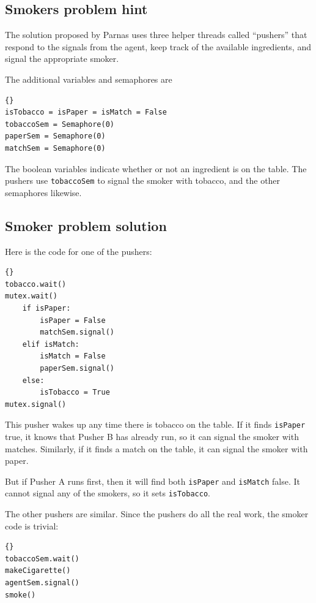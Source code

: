 \documentclass{book}
\begin{document}
\subsection{Smokers problem hint}

The solution proposed by Parnas uses three helper threads
called ``pushers'' that respond to the signals from the agent,
keep track of the available ingredients, and signal the
appropriate smoker.

The additional variables and semaphores are

\begin{lstlisting}[title={Smokers problem hint}]{}
isTobacco = isPaper = isMatch = False
tobaccoSem = Semaphore(0)
paperSem = Semaphore(0)
matchSem = Semaphore(0)
\end{lstlisting}

The boolean variables indicate whether or not an ingredient
is on the table.  The pushers use {\tt tobaccoSem} to signal
the smoker with tobacco, and the other semaphores likewise.



\subsection{Smoker problem solution}

Here is the code for one of the pushers:

\begin{lstlisting}[title={Pusher A}]{}
tobacco.wait()
mutex.wait()
    if isPaper:
        isPaper = False
        matchSem.signal()
    elif isMatch:
        isMatch = False
        paperSem.signal()
    else: 
        isTobacco = True
mutex.signal()
\end{lstlisting}

This pusher wakes up any time there is tobacco on the
table.  If it finds {\tt isPaper} true, it knows that
Pusher B has already run, so it can signal the smoker
with matches.  Similarly, if it finds a match on the
table, it can signal the smoker with paper.

But if Pusher A runs first, then it will find both
    {\tt isPaper} and {\tt isMatch} false.  It cannot signal
any of the smokers, so it sets {\tt isTobacco}.

The other pushers are similar.  Since the pushers do all
the real work, the smoker code is trivial:

\pagebreak
\begin{lstlisting}[title={Smoker with tobacco}]{}
tobaccoSem.wait()
makeCigarette()
agentSem.signal()
smoke()
\end{lstlisting}
\end{document}
